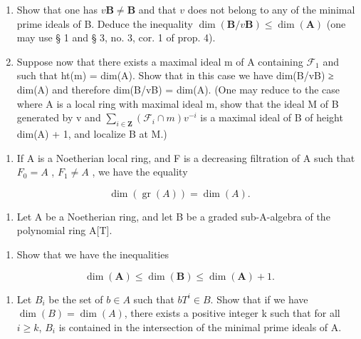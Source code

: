 \begin{enumerate}
\def\labelenumi{\alph{enumi})}
\setcounter{enumi}{3}
\item
  Show that one has \(v\mathbf{B} \neq \mathbf{B}\) and that \(v\) does not belong to any of the minimal prime ideals of B. Deduce the inequality \(\dim(\mathbf{B}/v\mathbf{B}) \leqslant \dim(\mathbf{A})\) (one may use § 1 and § 3, no. 3, cor. 1 of prop. 4).
\item
  Suppose now that there exists a maximal ideal m of A containing \(\mathcal{F}_1\) and such that ht(m) = dim(A). Show that in this case we have dim(B/vB) ≥ dim(A) and therefore dim(B/vB) = dim(A). (One may reduce to the case where A is a local ring with maximal ideal m, show that the ideal M of B generated by v and \(\sum_{i\in\mathbf{Z}}(\mathcal{F}_i\cap m)v^{-i}\) is a maximal ideal of B of height dim(A) + 1, and localize B at M.)
\end{enumerate}





\begin{enumerate}
\def\labelenumi{\alph{enumi})}
\setcounter{enumi}{5}
\tightlist
\item
  If A is a Noetherian local ring, and F is a decreasing filtration of A such that \(F_{0} = A\) , \(F_{1} \neq A\) , we have the equality
\end{enumerate}

\[
\dim (\operatorname{gr} (A)) = \dim (A).
\]

\begin{enumerate}
\def\labelenumi{\arabic{enumi})}
\setcounter{enumi}{7}
\tightlist
\item
  Let A be a Noetherian ring, and let B be a graded sub-A-algebra of the polynomial ring A{[}T{]}.
\end{enumerate}

\begin{enumerate}
\def\labelenumi{\alph{enumi})}
\tightlist
\item
  Show that we have the inequalities
\end{enumerate}

\[
\dim (\mathbf {A}) \leqslant \dim (\mathbf {B}) \leqslant \dim (\mathbf {A}) + 1.
\]

\begin{enumerate}
\def\labelenumi{\alph{enumi})}
\setcounter{enumi}{1}
\tightlist
\item
  Let \(B_{i}\) be the set of \(b \in A\) such that \(bT^{i} \in B\). Show that if we have \(\dim(B) = \dim(A)\), there exists a positive integer k such that for all \(i \geqslant k\), \(B_{i}\) is contained in the intersection of the minimal prime ideals of A.
\end{enumerate}

